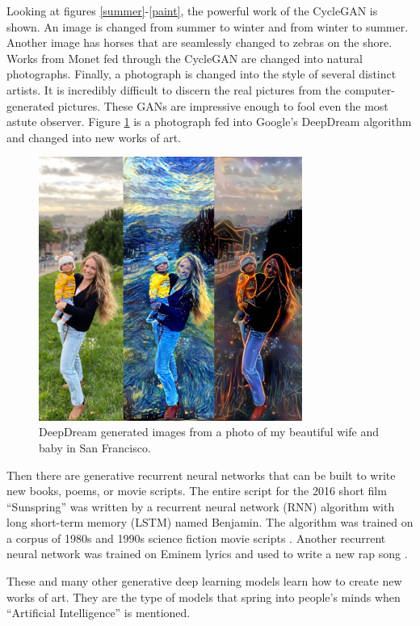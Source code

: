 \documentclass[5p,authoryear]{elsarticle}
\begin{document}
Looking at figures \ref{summer}-\ref{paint}, the powerful work of the CycleGAN is shown. An image is changed from summer to winter and from winter to summer. Another image has horses that are seamlessly changed to zebras on the shore. Works from Monet fed through the CycleGAN are changed into natural photographs. Finally, a photograph is changed into the style of several distinct artists. It is incredibly difficult to discern the real pictures from the computer-generated pictures. These GANs are impressive enough to fool even the most astute observer. Figure \ref{wife} is a photograph fed into Google’s DeepDream algorithm and changed into new works of art. 

\begin{figure}[!htb] \centering
	\includegraphics[width=3.4in]{figures/Perfection-DeepDream.jpg}
	\caption[]{DeepDream generated images from a photo of my beautiful wife and baby in San Francisco.} \label{wife} 
\end{figure}

Then there are generative recurrent neural networks that can be built to write new books, poems, or movie scripts. The entire script for the 2016 short film “Sunspring” was written by a recurrent neural network (RNN) algorithm with long short-term memory (LSTM) named Benjamin. The algorithm was trained on a corpus of 1980s and 1990s science fiction movie scripts \citep{movie}. Another recurrent neural network was trained on Eminem lyrics and used to write a new rap song \citep{slim}. 

These and many other generative deep learning models learn how to create new works of art. They are the type of models that spring into people’s minds when “Artificial Intelligence” is mentioned. 
\end{document}
